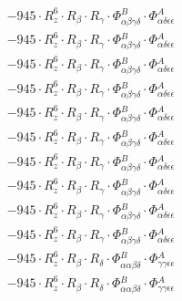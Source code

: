 \documentclass{article}
\begin{document}
\begin{subequations}
\begin{gather}
\begin{array}{c}
 \\[0.2em] 		 - 945 \cdot R_{z}^{6} \cdot R_{\beta{}} \cdot R_{\gamma{}} \cdot \Phi{}^{B}_{\alpha{}\beta{}\gamma{}\delta{}} \cdot \Phi{}^{A}_{\alpha{}\delta{}\epsilon{}\epsilon{}} 
 \\[0.2em] 		 - 945 \cdot R_{z}^{6} \cdot R_{\beta{}} \cdot R_{\gamma{}} \cdot \Phi{}^{B}_{\alpha{}\beta{}\gamma{}\delta{}} \cdot \Phi{}^{A}_{\alpha{}\delta{}\epsilon{}\epsilon{}} 
 \\[0.2em] 		 - 945 \cdot R_{z}^{6} \cdot R_{\beta{}} \cdot R_{\gamma{}} \cdot \Phi{}^{B}_{\alpha{}\beta{}\gamma{}\delta{}} \cdot \Phi{}^{A}_{\alpha{}\delta{}\epsilon{}\epsilon{}} 
 \\[0.2em] 		 - 945 \cdot R_{z}^{6} \cdot R_{\beta{}} \cdot R_{\gamma{}} \cdot \Phi{}^{B}_{\alpha{}\beta{}\gamma{}\delta{}} \cdot \Phi{}^{A}_{\alpha{}\delta{}\epsilon{}\epsilon{}} 
 \\[0.2em] 		 - 945 \cdot R_{z}^{6} \cdot R_{\beta{}} \cdot R_{\gamma{}} \cdot \Phi{}^{B}_{\alpha{}\beta{}\gamma{}\delta{}} \cdot \Phi{}^{A}_{\alpha{}\delta{}\epsilon{}\epsilon{}} 
 \\[0.2em] 		 - 945 \cdot R_{z}^{6} \cdot R_{\beta{}} \cdot R_{\gamma{}} \cdot \Phi{}^{B}_{\alpha{}\beta{}\gamma{}\delta{}} \cdot \Phi{}^{A}_{\alpha{}\delta{}\epsilon{}\epsilon{}} 
 \\[0.2em] 		 - 945 \cdot R_{z}^{6} \cdot R_{\beta{}} \cdot R_{\gamma{}} \cdot \Phi{}^{B}_{\alpha{}\beta{}\gamma{}\delta{}} \cdot \Phi{}^{A}_{\alpha{}\delta{}\epsilon{}\epsilon{}} 
 \\[0.2em] 		 - 945 \cdot R_{z}^{6} \cdot R_{\beta{}} \cdot R_{\gamma{}} \cdot \Phi{}^{B}_{\alpha{}\beta{}\gamma{}\delta{}} \cdot \Phi{}^{A}_{\alpha{}\delta{}\epsilon{}\epsilon{}} 
 \\[0.2em] 		 - 945 \cdot R_{z}^{6} \cdot R_{\beta{}} \cdot R_{\gamma{}} \cdot \Phi{}^{B}_{\alpha{}\beta{}\gamma{}\delta{}} \cdot \Phi{}^{A}_{\alpha{}\delta{}\epsilon{}\epsilon{}} 
 \\[0.2em] 		 - 945 \cdot R_{z}^{6} \cdot R_{\beta{}} \cdot R_{\gamma{}} \cdot \Phi{}^{B}_{\alpha{}\beta{}\gamma{}\delta{}} \cdot \Phi{}^{A}_{\alpha{}\delta{}\epsilon{}\epsilon{}} 
 \\[0.2em] 		 - 945 \cdot R_{z}^{6} \cdot R_{\beta{}} \cdot R_{\delta{}} \cdot \Phi{}^{B}_{\alpha{}\alpha{}\beta{}\delta{}} \cdot \Phi{}^{A}_{\gamma{}\gamma{}\epsilon{}\epsilon{}} 
 \\[0.2em] 		 - 945 \cdot R_{z}^{6} \cdot R_{\beta{}} \cdot R_{\delta{}} \cdot \Phi{}^{B}_{\alpha{}\alpha{}\beta{}\delta{}} \cdot \Phi{}^{A}_{\gamma{}\gamma{}\epsilon{}\epsilon{}} 

\end{array}
\end{gather}
\end{subequations}
\end{document}
